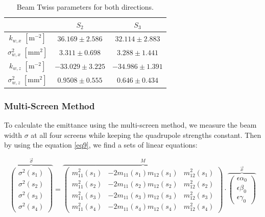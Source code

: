 \documentclass[12pt]{article}
\begin{document}
\begin{table}[H]
    \centering
    \begin{tabular}{c|c|c}

         &  $S_2$ & $S_3$\\
    \hline
         $k_{w,x}$ $\mathrm{[m^{-2}]}$ & $ 36.169 \pm 2.586 $  & $ 32.114 \pm 2.883 $ \\
         $\sigma^2_{w,x}$ $\mathrm{[mm^{2}]}$ & $ 3.311 \pm 0.698 $
            & $ 3.288 \pm 1.441$\\
         
         $k_{w,z}$ $\mathrm{[m^{-2}]}$ & $ -33.029 \pm 3.225 $& $ -34.986 \pm 1.391 $\\
         
         $\sigma^2_{w,z}$ $\mathrm{[mm^{2}]}$& $ 0.9508 \pm 0.555 $ & $ 0.646 \pm 0.434$\\
    \hline
    \end{tabular}
    \caption{Beam Twiss parameters for both directions.}
    \label{tab9}
\end{table}



\subsubsection{Multi-Screen Method}


To calculate the emittance using the multi-screen method, we measure the beam width $\sigma$ at all four screens while keeping the quadrupole strengths constant. Then by using the equation \ref{eq9}, we find a sets of linear equations: 

\begin{equation}
\overbrace{\left(\begin{array}{c}
\sigma^2\left(s_1\right) \\
\sigma^2\left(s_2\right) \\
\sigma^2\left(s_3\right) \\
\sigma^2\left(s_4\right)
\end{array}\right)}^{\vec{\sigma}}=\overbrace{\left(\begin{array}{lll}
m_{11}^2\left(s_1\right) & -2 m_{11}\left(s_1\right) m_{12}\left(s_1\right) & m_{12}^2\left(s_1\right) \\
m_{11}^2\left(s_2\right) & -2 m_{11}\left(s_2\right) m_{12}\left(s_2\right) & m_{12}^2\left(s_2\right) \\
m_{11}^2\left(s_3\right) & -2 m_{11}\left(s_3\right) m_{12}\left(s_3\right) & m_{12}^2\left(s_3\right) \\
m_{11}^2\left(s_4\right) & -2 m_{11}\left(s_4\right) m_{12}\left(s_4\right) & m_{12}^2\left(s_4\right)
\end{array}\right)}^M \cdot \overbrace{\left(\begin{array}{c}
\epsilon \alpha_0 \\
\epsilon \beta_0 \\
\epsilon \gamma_0
\end{array}\right)}^{\vec{x}}
\label{eq20}
\end{equation}
\end{document}
